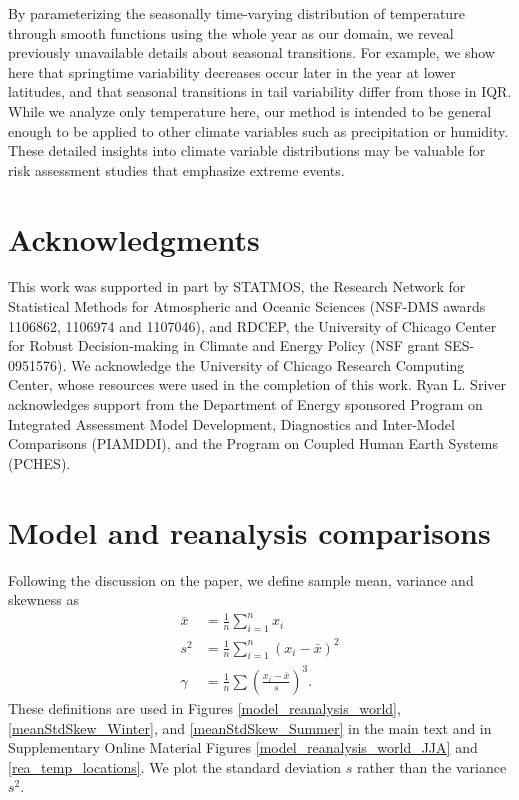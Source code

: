 \documentclass{ametsoc}
\begin{document}
By parameterizing the seasonally time-varying distribution of temperature through smooth functions using the whole year as our domain, we reveal previously unavailable details  about seasonal transitions. For example, we show here that springtime variability decreases occur later in the year at lower latitudes, and that seasonal transitions in tail variability differ from those in IQR.  While we analyze only temperature here, our method is intended to be general enough to be applied to other climate variables such as precipitation or humidity.
These detailed insights into climate variable distributions may be valuable for risk assessment studies that emphasize extreme events.

\section*{Acknowledgments}
This work was supported in part by STATMOS, the Research Network for Statistical Methods for
Atmospheric and Oceanic Sciences (NSF-DMS awards 1106862,
1106974 and 1107046), and RDCEP, the University of Chicago
Center for Robust Decision-making in Climate and Energy Policy
(NSF grant SES-0951576). We acknowledge the University of Chicago
Research  Computing  Center,  whose  resources  were  used  in  the
completion of this work. Ryan L. Sriver acknowledges support from the Department of Energy sponsored Program on Integrated Assessment Model Development, Diagnostics and Inter-Model Comparisons (PIAMDDI), and the Program on Coupled Human Earth Systems (PCHES).

\newpage
\appendix

\section{Model and reanalysis comparisons}
\label{app:moments}

Following the discussion on the paper, we define sample mean, variance and skewness as
\begin{align}
\bar{x} &= \frac{1}{n}\sum_{i=1}^n x_i \nonumber\\ 
s^2 &= \frac{1}{n}\sum_{i=1}^n \left(x_i - \bar{x}\right)^2 \nonumber\\ 
\gamma &= \frac{1}{n}\sum \left(\frac{x_i - \bar{x}}{s}\right)^3.
\end{align}
These definitions are used in Figures \ref{model_reanalysis_world}, \ref{meanStdSkew_Winter}, and \ref{meanStdSkew_Summer} in the main text  
and in Supplementary Online Material Figures \ref{model_reanalysis_world_JJA} and \ref{rea_temp_locations}. We plot the standard deviation ${s}$ rather than the variance $s^2$. %
\end{document}
